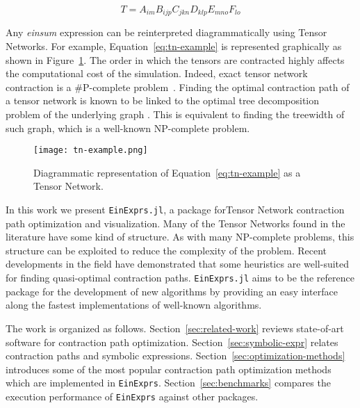 \documentclass{juliacon}
\begin{document}
\begin{equation}\label{eq:tn-example}
    T = A_{im} B_{ijp} C_{jkn} D_{klp} E_{mno} F_{lo} 
\end{equation} 

Any \textit{einsum} expression can be reinterpreted diagrammatically using Tensor Networks. For example, Equation~\ref{eq:tn-example} is represented graphically as shown in Figure~\ref{fig:tn-example}. The order in which the tensors are contracted highly affects the computational cost of the simulation. Indeed, exact tensor network contraction is a \#P-complete problem~\cite{garcia2012exact}. Finding the optimal contraction path of a tensor network is known to be linked to the optimal tree decomposition problem of the underlying graph \cite{markov2008simulating}. This is equivalent to finding the treewidth of such graph, which is a well-known NP-complete problem.

\begin{figure}[h]
    \centering
    \texttt{[image: tn-example.png]}
    \caption{Diagrammatic representation of Equation~\ref{eq:tn-example} as a Tensor Network.}
    \label{fig:tn-example}
\end{figure}


In this work we present \texttt{EinExprs.jl}, a package forTensor Network contraction path optimization and visualization. Many of the Tensor Networks found in the literature have some kind of structure. As with many NP-complete problems, this structure can be exploited to reduce the complexity of the problem. Recent developments in the field have demonstrated that some heuristics are well-suited for finding quasi-optimal contraction paths. \texttt{EinExprs.jl} aims to be the reference package for the development of new algorithms by providing an easy interface along the fastest implementations of well-known algorithms.

The work is organized as follows. Section~\ref{sec:related-work} reviews state-of-art software for contraction path optimization. Section~\ref{sec:symbolic-expr} relates contraction paths and symbolic expressions. Section~\ref{sec:optimization-methods} introduces some of the most popular contraction path optimization methods which are implemented in \texttt{EinExprs}. Section~\ref{sec:benchmarks} compares the execution performance of \texttt{EinExprs} against other packages.
\end{document}
